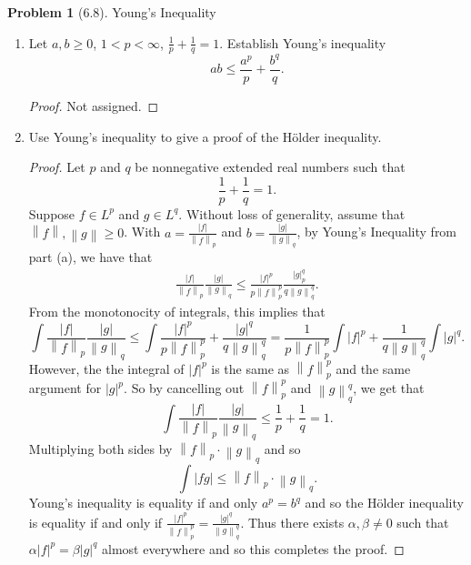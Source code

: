 \documentclass[12pt]{article}
\newcommand{\norm}[1]{\left\lVert #1 \right\rVert}
\theoremstyle{definition}
\newtheorem{problem}{Problem}
\begin{document}
\begin{problem}[6.8] Young's Inequality

    \begin{enumerate}[label = (\alph{*})]
        \item Let \( a, b \geq 0 \), \( 1 < p < \infty \), \( \displaystyle \frac{1}{p} + \frac{1}{q} = 1 \). Establish Young's inequality 
            \[
                ab \leq \frac{a^p}{p} + \frac{b^q}{q}.
            \]
            \begin{proof}
                Not assigned. 
            \end{proof}
        \item Use Young's inequality to give a proof of the H\"{o}lder inequality.
            \begin{proof}
                Let \( p \) and \( q \) be nonnegative extended real numbers such that
                    \[
                        \frac{1}{p} + \frac{1}{q} = 1.  
                    \]
                Suppose \( f \in L^p \) and \( g \in L^q \). Without loss of generality, assume that \( \norm{f}, \norm{g} \geq 0 \). 
                With \( \displaystyle a = \frac{|f|}{\norm{f}_p} \) and \( \displaystyle b = \frac{|g|}{\norm{g}_q} \), by Young's Inequality from part (a), we have that
                    \begin{align*}
                        \frac{|f|}{\norm{f}_p} \frac{|g|}{\norm{g}_q} \leq \frac{|f|^p}{p\norm{f}^{p}_{p}} \frac{|g|^q_p}{q\norm{g}^{q}_{q}}.
                    \end{align*}
                From the monotonocity of integrals, this implies that
                    \[
                        \int \frac{|f|}{\norm{f}_p} \frac{|g|}{\norm{g}_q} \leq \int \frac{|f|^p}{p\norm{f}_{p}^{p}} + \frac{|g|^q}{q\norm{g}^{q}_{q}} = \frac{1}{p \norm{f}^{p}_{p}} \int |f|^p + \frac{1}{q\norm{g}^{q}_{q}} \int |g|^q.
                    \]
                However, the the integral of \( |f|^p \) is the same as \( \norm{f}^p_p \) and the same argument for \( |g|^p \). 
                So by cancelling out \( \norm{f}^p_p \) and \( \norm{g}^q_q \), we get that
                    \[
                        \int \frac{|f|}{\norm{f}_p} \frac{|g|}{\norm{g}_q} \leq \frac{1}{p} + \frac{1}{q} = 1.
                    \]
                Multiplying both sides by \( \norm{f}_p \cdot \norm{g}_q \) and so
                    \[
                        \int |fg| \leq \norm{f}_p \cdot \norm{g}_q.
                    \]
                Young's inequality is equality if and only \( a^p = b^q \) and so the H\"{o}lder inequality is equality if and only if \( \displaystyle \frac{|f|^p}{\norm{f}^p_p} =  \frac{|g|^q}{\norm{g}_q^q} \). 
                Thus there exists \( \alpha, \beta \neq 0 \) such that \( \alpha |f|^p = \beta |g|^q \) almost everywhere and so this completes the proof.
            \end{proof}
    \end{enumerate}
    
\end{problem}
\end{document}
